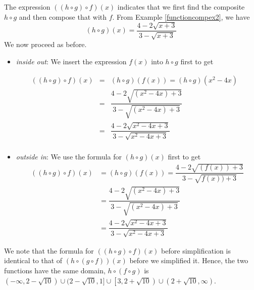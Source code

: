 {\medskip  


\drawexampleline

The expression $((h \circ g) \circ f)(x)$ indicates that we first find the composite $h \circ g$ and then compose that with $f$.  From Example \ref{functioncompex2}, we have \[(h \circ g)(x) = \frac{4-2\sqrt{x+3}}{3-\sqrt{x+3}}\]  We now proceed as before.

\begin{itemize}

\item  \textit{inside out}: We insert the expression $f(x)$ into $h \circ g$ first to get 

\[ \begin{array}{rclr}
((h \circ g) \circ f)(x) & = & (h \circ g)(f(x)) = (h \circ g)\left(x^2-4x\right) & \\ [2pt]
                         & = & \dfrac{4-2\sqrt{\left(x^2-4x\right)+3}}{3-\sqrt{\left(x^2-4x\right)+3}} & \\ [12pt]
                         & = & \dfrac{4 - 2\sqrt{x^2-4x+3}}{3 - \sqrt{x^2-4x+3}} & \\ \end{array}\]

\item  \textit{outside in}:  We use the formula for $(h \circ g)(x)$ first to get
\begin{align*}
((h \circ g) \circ f)(x) & = (h \circ g)(f(x))=\dfrac{4-2\sqrt{(f(x))+3}}{3-\sqrt{f(x))+3}}\\
 & = \dfrac{4 - 2\sqrt{\left(x^2-4x\right)+3}}{3 - \sqrt{\left(x^2-4x\right)+3}}\\
 & = \dfrac{4 - 2\sqrt{x^2-4x+3}}{3 - \sqrt{x^2-4x+3}}
 \end{align*}
 
 \end{itemize}

 
We note that the formula for $((h \circ g) \circ f)(x)$ before simplification is identical to that of $(h \circ (g \circ f))(x)$ before we simplified it.  Hence, the two functions have the same domain, $h \circ (f \circ g)$ is $(-\infty, 2 -\sqrt{10}) \cup (2 - \sqrt{10}, 1] \cup \left[3, 2 + \sqrt{10}\right) \cup \left(2+\sqrt{10}, \infty\right)$. 
}

\medskip



